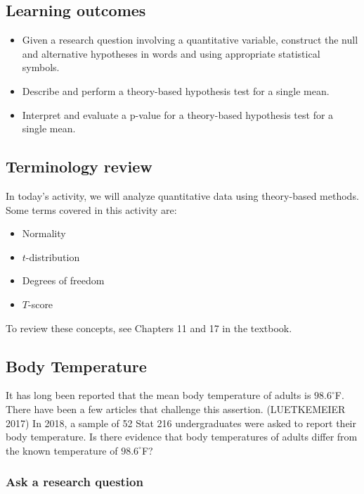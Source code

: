 \documentclass[
]{report}
\begin{document}

\subsection{Learning outcomes}\label{learning-outcomes-2}

\begin{itemize}
\item
  Given a research question involving a quantitative variable, construct the null and alternative hypotheses
  in words and using appropriate statistical symbols.
\item
  Describe and perform a theory-based hypothesis test for a single mean.
\item
  Interpret and evaluate a p-value for a theory-based hypothesis test for a single mean.
\end{itemize}

\subsection{Terminology review}\label{terminology-review-2}

In today's activity, we will analyze quantitative data using theory-based methods. Some terms covered in this activity are:

\begin{itemize}
\item
  Normality
\item
  \(t\)-distribution
\item
  Degrees of freedom
\item
  \(T\)-score
\end{itemize}

To review these concepts, see Chapters 11 and 17 in the textbook.

\subsection{Body Temperature}\label{body-temperature}

It has long been reported that the mean body temperature of adults is \(98.6^{\circ}\)F. There have been a few articles that challenge this assertion. (LUETKEMEIER 2017) In 2018, a sample of 52 Stat 216 undergraduates were asked to report their body temperature. Is there evidence that body temperatures of adults differ from the known temperature of \(98.6^{\circ}\)F?

\subsubsection*{Ask a research question}\label{ask-a-research-question-1}
\end{document}

